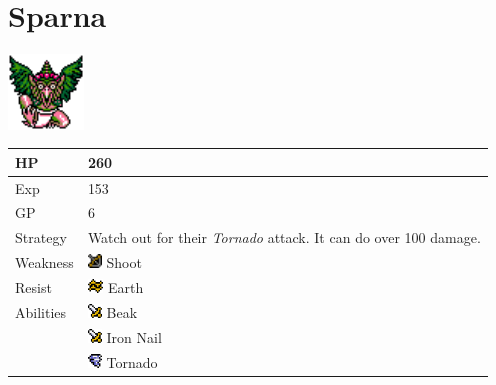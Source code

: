 \section{Sparna}
\label{monster:sparna}

\includegraphics[height=2cm,keepaspectratio]{./resources/monster/sparna}

\begin{longtable}{ l p{9cm} }
	HP
	& 260
\\ \hline
	Exp
	& 153
\\ \hline
	GP
	& 6
\\ \hline
	Strategy
	& Watch out for their \textit{Tornado} attack. It can do over 100 damage.
\\ \hline
	Weakness
	& \includegraphics[height=1em,keepaspectratio]{./resources/effects/shoot} Shoot
\\ \hline
	Resist
	& \includegraphics[height=1em,keepaspectratio]{./resources/effects/earth} Earth
\\ \hline
	Abilities
	& \includegraphics[height=1em,keepaspectratio]{./resources/effects/damage} Beak \\
	& \includegraphics[height=1em,keepaspectratio]{./resources/effects/damage} Iron Nail \\
	& \includegraphics[height=1em,keepaspectratio]{./resources/effects/wind} Tornado
\end{longtable}
